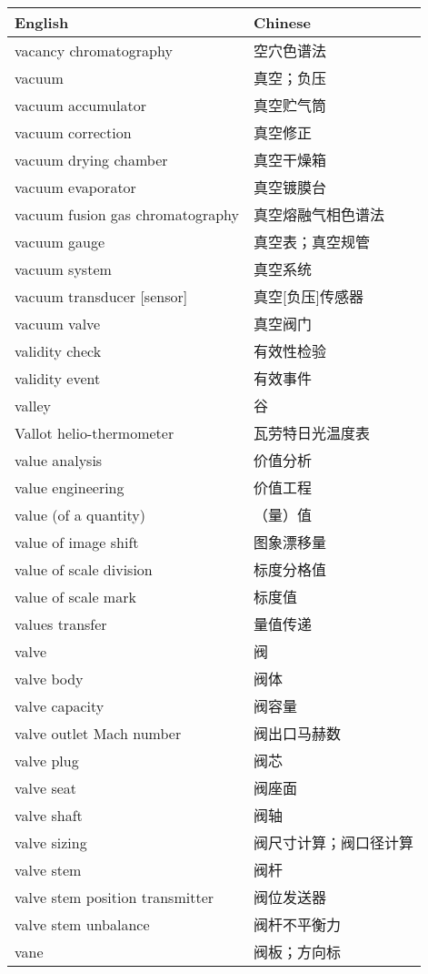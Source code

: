 \documentclass[
]{article}
\begin{document}
\begin{longtable}[]{@{}ll@{}}
\toprule()
English & Chinese \\
\midrule()
\endhead
vacancy chromatography & 空穴色谱法 \\
vacuum & 真空；负压 \\
vacuum accumulator & 真空贮气筒 \\
vacuum correction & 真空修正 \\
vacuum drying chamber & 真空干燥箱 \\
vacuum evaporator & 真空镀膜台 \\
vacuum fusion gas chromatography & 真空熔融气相色谱法 \\
vacuum gauge & 真空表；真空规管 \\
vacuum system & 真空系统 \\
vacuum transducer {[}sensor{]} & 真空{[}负压{]}传感器 \\
vacuum valve & 真空阀门 \\
validity check & 有效性检验 \\
validity event & 有效事件 \\
valley & 谷 \\
Vallot helio-thermometer & 瓦劳特日光温度表 \\
value analysis & 价值分析 \\
value engineering & 价值工程 \\
value (of a quantity) & （量）值 \\
value of image shift & 图象漂移量 \\
value of scale division & 标度分格值 \\
value of scale mark & 标度值 \\
values transfer & 量值传递 \\
valve & 阀 \\
valve body & 阀体 \\
valve capacity & 阀容量 \\
valve outlet Mach number & 阀出口马赫数 \\
valve plug & 阀芯 \\
valve seat & 阀座面 \\
valve shaft & 阀轴 \\
valve sizing & 阀尺寸计算；阀口径计算 \\
valve stem & 阀杆 \\
valve stem position transmitter & 阀位发送器 \\
valve stem unbalance & 阀杆不平衡力 \\
vane & 阀板；方向标 \\

\end{longtable}
\end{document}
